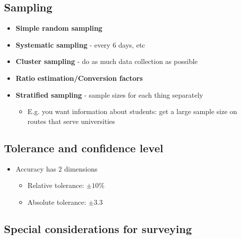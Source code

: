 \documentclass[11pt]{article}
\begin{document}
\subsection{Sampling}
\label{sec:org7c9dff5}
\begin{itemize}
\item \textbf{Simple random sampling}
\item \textbf{Systematic sampling} - every 6 days, etc
\item \textbf{Cluster sampling} - do as much data collection as possible
\item \textbf{Ratio estimation/Conversion factors}
\item \textbf{Stratified sampling} - sample sizes for each thing separately
\begin{itemize}
\item E.g. you want information about students: get a large sample size on routes that serve universities
\end{itemize}
\end{itemize}

\subsection{Tolerance and confidence level}
\label{sec:orge83781a}
\begin{itemize}
\item Accuracy has 2 dimensions
\begin{itemize}
\item Relative tolerance: \(\pm 10\%\)
\item Absolute tolerance: \(\pm 3.3\)
\end{itemize}
\end{itemize}

\subsection{Special considerations for surveying}
\label{sec:orgc64598e}
\end{document}
